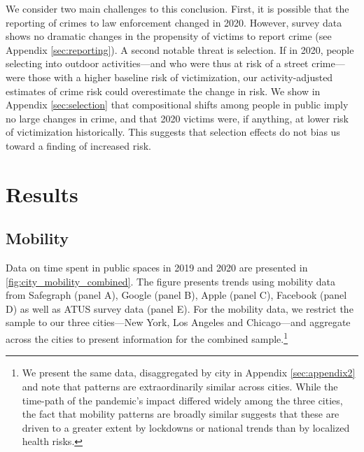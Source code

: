 \documentclass[12pt]{article}
\begin{document}
We consider two main challenges to this conclusion. First, it is possible that the reporting of crimes to law enforcement changed in 2020. However, survey data shows no dramatic changes in the propensity of victims to report crime (see Appendix \ref{sec:reporting}). A second notable threat is selection. If in 2020, people selecting into outdoor activities---and who were thus at risk of a street crime---were those with a higher baseline risk of victimization, our activity-adjusted estimates of crime risk could overestimate the change in risk. We show in Appendix \ref{sec:selection} that compositional shifts among people in public imply no large changes in crime, and that 2020 victims were, if anything, at lower risk of victimization historically. This suggests that selection effects do not bias us toward a finding of increased risk.

\section{Results}
\subsection{Mobility}
Data on time spent in public spaces in 2019 and 2020 are presented in \autoref{fig:city_mobility_combined}. The figure presents trends using mobility data from Safegraph (panel A), Google (panel B), Apple (panel C), Facebook (panel D) as well as ATUS survey data (panel E). %
For the mobility data, we restrict the sample to our three cities---New York, Los Angeles and Chicago---and aggregate across the cities to present information for the combined sample.\footnote{We present the same data, disaggregated by city in Appendix \ref{sec:appendix2} and note that patterns are extraordinarily similar across cities. While the time-path of the pandemic's impact differed widely among the three cities, the fact that mobility patterns are broadly similar suggests that these are driven to a greater extent by lockdowns or national trends than by localized health risks. }
\end{document}

